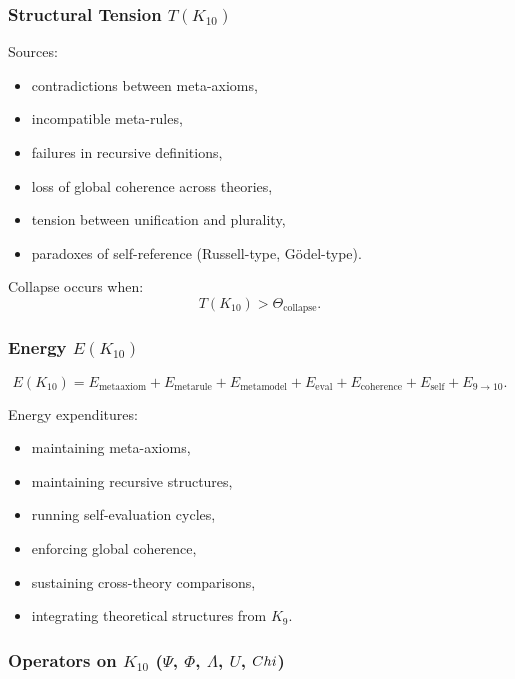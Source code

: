 \subsubsection{Structural Tension $T(K_{10})$}

Sources:
\begin{itemize}
    \item contradictions between meta-axioms,
    \item incompatible meta-rules,
    \item failures in recursive definitions,
    \item loss of global coherence across theories,
    \item tension between unification and plurality,
    \item paradoxes of self-reference (Russell-type, Gödel-type).
\end{itemize}

Collapse occurs when:
\[
T(K_{10}) > \Theta_{\mathrm{collapse}}.
\]

\subsubsection{Energy $E(K_{10})$}

\[
E(K_{10})=
E_{\mathrm{metaaxiom}}+
E_{\mathrm{metarule}}+
E_{\mathrm{metamodel}}+
E_{\mathrm{eval}}+
E_{\mathrm{coherence}}+
E_{\mathrm{self}}+
E_{9\to10}.
\]

Energy expenditures:
\begin{itemize}
    \item maintaining meta-axioms,
    \item maintaining recursive structures,
    \item running self-evaluation cycles,
    \item enforcing global coherence,
    \item sustaining cross-theory comparisons,
    \item integrating theoretical structures from $K_9$.
\end{itemize}

\subsubsection{Operators on $K_{10}$ ($\Psi$, $\Phi$, $\Lambda$, $U$, $Chi$)}

